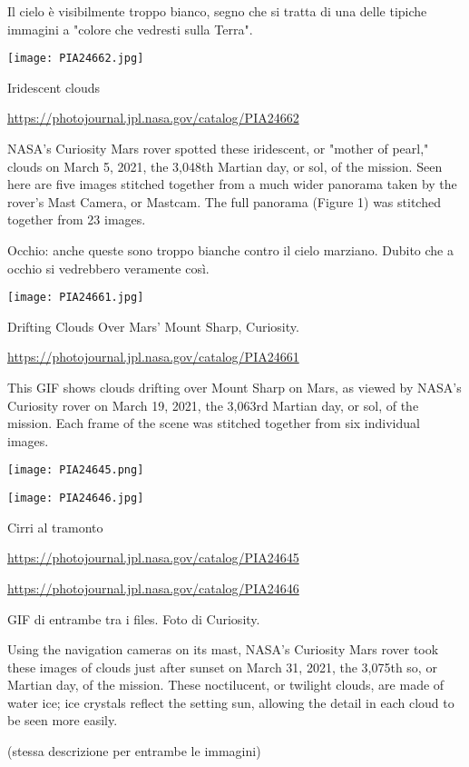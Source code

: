 \documentclass[a4paper,10pt,openany,oneside]{memoir}
\begin{document}
Il cielo è visibilmente troppo bianco, segno che si tratta di una delle tipiche immagini a "colore che vedresti sulla Terra".



\texttt{[image: PIA24662.jpg]}

Iridescent clouds

\url{https://photojournal.jpl.nasa.gov/catalog/PIA24662}


NASA's Curiosity Mars rover spotted these iridescent, or "mother of pearl," clouds on March 5, 2021, the 3,048th Martian day, or sol, of the mission. Seen here are five images stitched together from a much wider panorama taken by the rover's Mast Camera, or Mastcam. The full panorama (Figure 1) was stitched together from 23 images.

Occhio: anche queste sono troppo bianche contro il cielo marziano. Dubito che a occhio si vedrebbero veramente così.



\texttt{[image: PIA24661.jpg]}

Drifting Clouds Over Mars' Mount Sharp, Curiosity.

\url{https://photojournal.jpl.nasa.gov/catalog/PIA24661}

This GIF shows clouds drifting over Mount Sharp on Mars, as viewed by NASA's Curiosity rover on March 19, 2021, the 3,063rd Martian day, or sol, of the mission. Each frame of the scene was stitched together from six individual images.



\texttt{[image: PIA24645.png]}

\texttt{[image: PIA24646.jpg]}

Cirri al tramonto

\url{https://photojournal.jpl.nasa.gov/catalog/PIA24645}

\url{https://photojournal.jpl.nasa.gov/catalog/PIA24646}

GIF di entrambe tra i files. Foto di Curiosity.

Using the navigation cameras on its mast, NASA's Curiosity Mars rover took these images of clouds just after sunset on March 31, 2021, the 3,075th so, or Martian day, of the mission. These noctilucent, or twilight clouds, are made of water ice; ice crystals reflect the setting sun, allowing the detail in each cloud to be seen more easily.

(stessa descrizione per entrambe le immagini)
\end{document}
